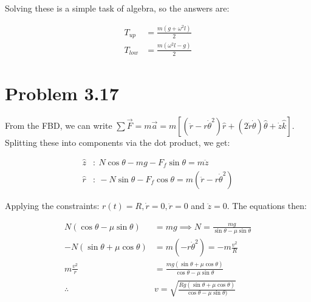 \documentclass{article}
\theoremstyle{definition}
\numberwithin{equation}{section}
\numberwithin{definition}{section}
\begin{document}
	Solving these is a simple task of algebra, so the answers are:
	
	\begin{align*}
		T_{up} &= \frac{m(g+\omega^2l)}{2}\\
		T_{low} &= \frac{m(\omega^2l-g)}{2} 
	\end{align*}
	\section{Problem 3.17} %
	
	
	From the FBD, we can write $\sum \vec{F} = m\vec a = m [(\ddot r - r\dot \theta^2) \hat r + (2 \dot r \dot \theta) \hat \theta + \dot z \hat k]$. Splitting these into components via the dot product, we get:
	
	
	\begin{align*}
		\hat z&: \ N \cos \theta  - mg - F_f \sin \theta = m\ddot z\\
		\hat r&: \ -N\sin\theta - F_f\cos\theta = m (\ddot r - r\dot \theta^2)
	\end{align*}

	Applying the constraints: $r(t) = R, \dot r = 0, \ddot r = 0$ and $\ddot z = 0$. The equations then:
	
	\begin{align*}
		N (\cos \theta - \mu \sin \theta) &= mg \implies N = \frac{mg}{\sin \theta -\mu \sin \theta}\\
		-N(\sin \theta + \mu \cos \theta) &= m(-r \dot \theta^2) = -m\frac{v^2}{R}\\
		m\frac{v^2}{r} &= \frac{mg(\sin \theta + \mu \cos \theta)}{\cos \theta - \mu \sin \theta}\\ 
		\therefore & \boxed{v = \sqrt{\frac{Rg(\sin \theta + \mu \cos \theta)}{\cos \theta - \mu \sin \theta)}}}
	\end{align*}
	
	
\end{document}
